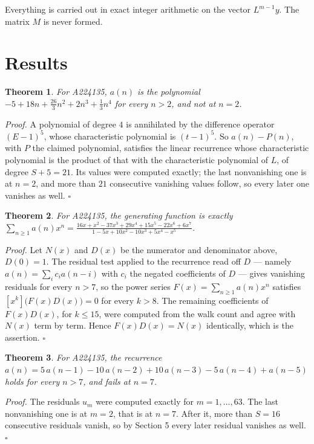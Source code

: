 \documentclass[11pt]{article}
\newtheorem{theorem}{Theorem}
\theoremstyle{definition}
\begin{document}
Everything is carried out in exact integer arithmetic on the vector $L^{m-1}y$. The matrix $M$ is never formed.

\section{Results}

\begin{theorem} For A224135, $a(n)$ is the polynomial $-5 + 18n + \frac{26}{3}n^{2} + 2n^{3} + \frac{1}{3}n^{4}$ for every $n > 2$, and not at $n = 2$.\end{theorem}

{\itshape Proof.} A polynomial of degree $4$ is annihilated by the difference operator $(E-1)^{5}$, whose characteristic polynomial is $(t-1)^{5}$. So $a(n) - P(n)$, with $P$ the claimed polynomial, satisfies the linear recurrence whose characteristic polynomial is the product of that with the characteristic polynomial of $L$, of degree $S + 5 = 21$. Its values were computed exactly; the last nonvanishing one is at $n = 2$, and more than $21$ consecutive vanishing values follow, so every later one vanishes as well. $\square$

\begin{theorem} For A224135, the generating function is exactly $\sum_{n\ge 1} a(n)x^n = \frac{16x + x^{2} - 37x^{3} + 29x^{4} + 15x^{5} - 22x^{6} + 6x^{7}}{1 - 5x + 10x^{2} - 10x^{3} + 5x^{4} - x^{5}}$.\end{theorem}

{\itshape Proof.} Let $N(x)$ and $D(x)$ be the numerator and denominator above, $D(0)=1$. The residual test applied to the recurrence read off $D$ --- namely $a(n) = \sum_i c_i a(n-i)$ with $c_i$ the negated coefficients of $D$ --- gives vanishing residuals for every $n > 7$, so the power series $F(x)=\sum_{n\ge 1}a(n)x^n$ satisfies $[x^k]\bigl(F(x)D(x)\bigr) = 0$ for every $k > 8$. The remaining coefficients of $F(x)D(x)$, for $k \le 15$, were computed from the walk count and agree with $N(x)$ term by term. Hence $F(x)D(x) = N(x)$ identically, which is the assertion. $\square$

\begin{theorem} For A224135, the recurrence $a(n) = 5\,a(n-1) - 10\,a(n-2) + 10\,a(n-3) - 5\,a(n-4) + a(n-5)$ holds for every $n > 7$, and fails at $n = 7$.\end{theorem}

{\itshape Proof.} The residuals $u_m$ were computed exactly for $m = 1,\dots,63$. The last nonvanishing one is at $m = 2$, that is at $n = 7$. After it, more than $S = 16$ consecutive residuals vanish, so by Section 5 every later residual vanishes as well. $\square$
\end{document}
